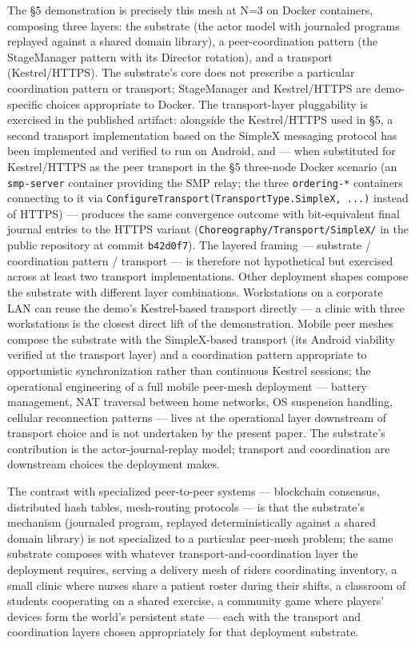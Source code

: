 \documentclass[
]{article}
\begin{document}
The §5 demonstration is precisely this mesh at N=3 on Docker containers,
composing three layers: the substrate (the actor model with journaled
programs replayed against a shared domain library), a peer-coordination
pattern (the StageManager pattern with its Director rotation), and a
transport (Kestrel/HTTPS). The substrate's core does not prescribe a
particular coordination pattern or transport; StageManager and
Kestrel/HTTPS are demo-specific choices appropriate to Docker. The
transport-layer pluggability is exercised in the published artifact:
alongside the Kestrel/HTTPS used in §5, a second transport
implementation based on the SimpleX messaging protocol has been
implemented and verified to run on Android, and --- when substituted for
Kestrel/HTTPS as the peer transport in the §5 three-node Docker scenario
(an \texttt{smp-server} container providing the SMP relay; the three
\texttt{ordering-*} containers connecting to it via
\texttt{ConfigureTransport(TransportType.SimpleX,\ ...)} instead of
HTTPS) --- produces the same convergence outcome with bit-equivalent
final journal entries to the HTTPS variant
(\texttt{Choreography/Transport/SimpleX/} in the public repository at
commit \texttt{b42d0f7}). The layered framing --- substrate /
coordination pattern / transport --- is therefore not hypothetical but
exercised across at least two transport implementations. Other
deployment shapes compose the substrate with different layer
combinations. Workstations on a corporate LAN can reuse the demo's
Kestrel-based transport directly --- a clinic with three workstations is
the closest direct lift of the demonstration. Mobile peer meshes compose
the substrate with the SimpleX-based transport (its Android viability
verified at the transport layer) and a coordination pattern appropriate
to opportunistic synchronization rather than continuous Kestrel
sessions; the operational engineering of a full mobile peer-mesh
deployment --- battery management, NAT traversal between home networks,
OS suspension handling, cellular reconnection patterns --- lives at the
operational layer downstream of transport choice and is not undertaken
by the present paper. The substrate's contribution is the
actor-journal-replay model; transport and coordination are downstream
choices the deployment makes.

The contrast with specialized peer-to-peer systems --- blockchain
consensus, distributed hash tables, mesh-routing protocols --- is that
the substrate's mechanism (journaled program, replayed deterministically
against a shared domain library) is not specialized to a particular
peer-mesh problem; the same substrate composes with whatever
transport-and-coordination layer the deployment requires, serving a
delivery mesh of riders coordinating inventory, a small clinic where
nurses share a patient roster during their shifts, a classroom of
students cooperating on a shared exercise, a community game where
players' devices form the world's persistent state --- each with the
transport and coordination layers chosen appropriately for that
deployment substrate.
\end{document}
